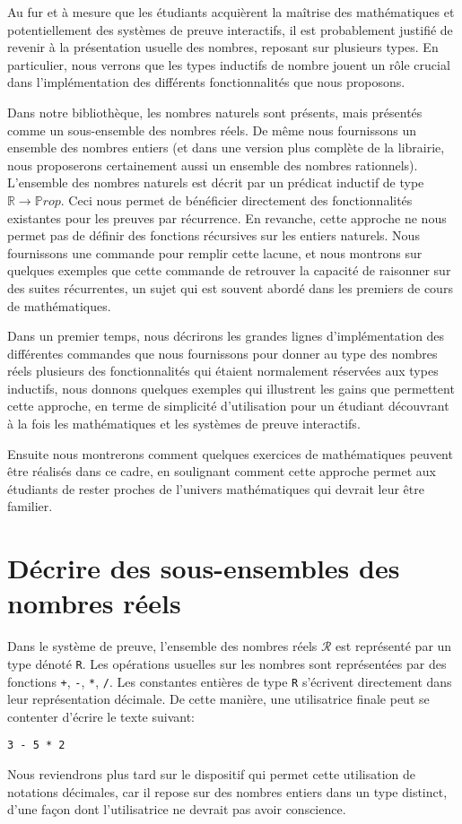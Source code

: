 \documentclass[draft]{jflart}
\begin{document}
Au fur et à mesure que les étudiants acquièrent la maîtrise des
mathématiques et potentiellement des systèmes de preuve interactifs,
il est probablement justifié de revenir à la présentation usuelle des
nombres, reposant sur plusieurs types.  En particulier, nous verrons
que les types inductifs de nombre jouent un rôle crucial dans
l'implémentation des différents fonctionnalités que nous proposons.

Dans notre bibliothèque, les nombres naturels sont présents, mais
présentés comme un sous-ensemble des nombres réels.  De même nous
fournissons un ensemble des nombres entiers (et dans une version plus
complète de la librairie, nous proposerons certainement aussi un
ensemble des nombres rationnels).  L'ensemble des nombres naturels est
décrit par un prédicat inductif de type \({\mathbb R} \rightarrow
{\mathbb Prop}\).  Ceci nous permet de bénéficier directement des
fonctionnalités existantes pour les preuves par récurrence.  En
revanche, cette approche ne nous permet pas de définir des fonctions
récursives sur les entiers naturels.  Nous fournissons une commande
pour remplir cette lacune, et nous montrons sur quelques exemples que
cette commande de retrouver la capacité de raisonner sur des suites
récurrentes, un sujet qui est souvent abordé dans les premiers de
cours de mathématiques.

Dans un premier temps, nous décrirons les grandes lignes d'implémentation des
différentes commandes que nous fournissons pour donner au type des
nombres réels plusieurs des fonctionnalités qui étaient normalement
réservées aux types inductifs, nous donnons quelques exemples qui
illustrent les gains que permettent cette approche, en terme de
simplicité d'utilisation pour un étudiant découvrant à la fois les
mathématiques et les systèmes de preuve interactifs.

Ensuite nous montrerons comment quelques exercices de mathématiques
peuvent être réalisés dans ce cadre, en soulignant comment cette
approche permet aux étudiants de rester proches de l'univers
mathématiques qui devrait leur être familier.
\section{Décrire des sous-ensembles des nombres réels}
Dans le système de preuve, l'ensemble des nombres réels \(\mathcal R\)
est représenté par un type dénoté \texttt{R}.  Les opérations usuelles
sur les nombres sont représentées par des fonctions \texttt{+}, \texttt{-},
\texttt{*}, \texttt{/}.  Les constantes entières de type \texttt{R} s'écrivent
directement dans leur représentation décimale.  De cette manière, une
utilisatrice finale peut se contenter d'écrire le texte suivant:
\begin{verbatim}
3 - 5 * 2
\end{verbatim}
Nous reviendrons plus tard sur le dispositif qui permet cette
utilisation de notations décimales, car il repose sur des nombres
entiers dans un type distinct, d'une façon dont l'utilisatrice ne
devrait pas avoir conscience.
\end{document}
